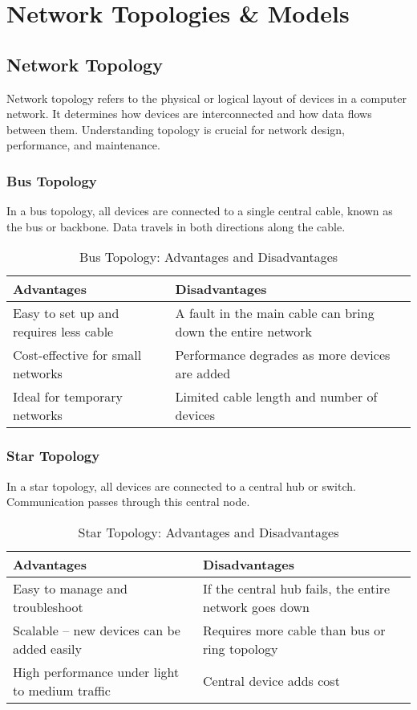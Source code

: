 \chapter{Network Topologies \& Models}

\section{Network Topology}

Network topology refers to the physical or logical layout of devices in a computer network. It determines how devices are interconnected and how data flows between them. Understanding topology is crucial for network design, performance, and maintenance.

\subsection{Bus Topology}
In a bus topology, all devices are connected to a single central cable, known as the bus or backbone. Data travels in both directions along the cable.

\begin{table}[H]
\centering
\caption{Bus Topology: Advantages and Disadvantages}
\begin{tabularx}{\linewidth}{|X|X|}
\hline
\textbf{Advantages} & \textbf{Disadvantages} \\
\hline
Easy to set up and requires less cable & A fault in the main cable can bring down the entire network \\
\hline
Cost-effective for small networks & Performance degrades as more devices are added \\
\hline
Ideal for temporary networks & Limited cable length and number of devices \\
\hline
\end{tabularx}
\end{table}

\subsection{Star Topology}
In a star topology, all devices are connected to a central hub or switch. Communication passes through this central node.

\begin{table}[H]
\centering
\caption{Star Topology: Advantages and Disadvantages}
\begin{tabularx}{\linewidth}{|X|X|}
\hline
\textbf{Advantages} & \textbf{Disadvantages} \\
\hline
Easy to manage and troubleshoot & If the central hub fails, the entire network goes down \\
\hline
Scalable – new devices can be added easily & Requires more cable than bus or ring topology \\
\hline
High performance under light to medium traffic & Central device adds cost \\
\hline
\end{tabularx}
\end{table}

